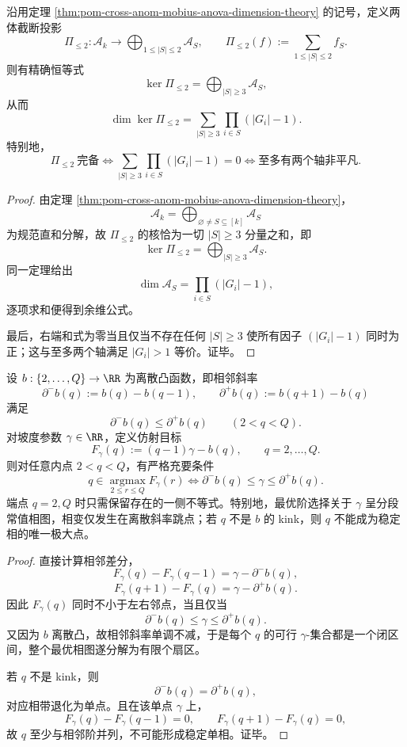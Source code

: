 \begin{theorem}[两体审计完备性的充要判据与精确余维]\label{thm:conclusion-two-body-audit-completeness-codimension}
沿用定理 \ref{thm:pom-cross-anom-mobius-anova-dimension-theory} 的记号，定义两体截断投影
\[
\Pi_{\le 2}:\mathcal A_k\to \bigoplus_{1\le |S|\le 2}\mathcal A_S,
\qquad
\Pi_{\le 2}(f):=\sum_{1\le |S|\le2} f_S.
\]
则有精确恒等式
\[
\ker \Pi_{\le2}=\bigoplus_{|S|\ge3}\mathcal A_S,
\]
从而
\[
\dim \ker \Pi_{\le2}
=
\sum_{|S|\ge3}\prod_{i\in S}(|G_i|-1).
\]
特别地，
\[
\Pi_{\le2}\ \text{完备}
\iff
\sum_{|S|\ge3}\prod_{i\in S}(|G_i|-1)=0
\iff
\text{至多有两个轴非平凡}.
\]
\end{theorem}
\begin{proof}
由定理 \ref{thm:pom-cross-anom-mobius-anova-dimension-theory}，
\[
\mathcal A_k=\bigoplus_{\varnothing\neq S\subseteq[k]}\mathcal A_S
\]
为规范直和分解，故 \(\Pi_{\le2}\) 的核恰为一切 \(|S|\ge3\) 分量之和，即
\[
\ker \Pi_{\le2}=\bigoplus_{|S|\ge3}\mathcal A_S.
\]
同一定理给出
\[
\dim \mathcal A_S=\prod_{i\in S}(|G_i|-1),
\]
逐项求和便得到余维公式。

最后，右端和式为零当且仅当不存在任何 \(|S|\ge3\) 使所有因子 \((|G_i|-1)\) 同时为正；这与至多两个轴满足 \(|G_i|>1\) 等价。证毕。
\end{proof}

\begin{theorem}\label{thm:conclusion-discrete-convex-budget-kink-fan}
设 \(b:\{2,\dots,Q\}\to\RR\) 为离散凸函数，即相邻斜率
\[
\partial^- b(q):=b(q)-b(q-1),
\qquad
\partial^+ b(q):=b(q+1)-b(q)
\]
满足
\[
\partial^- b(q)\le \partial^+ b(q)
\qquad (2<q<Q).
\]
对坡度参数 \(\gamma\in\RR\)，定义仿射目标
\[
F_\gamma(q):=(q-1)\gamma-b(q),
\qquad q=2,\dots,Q.
\]
则对任意内点 \(2<q<Q\)，有严格充要条件
\[
q\in \operatorname*{argmax}_{2\le r\le Q}F_\gamma(r)
\iff
\partial^- b(q)\le \gamma\le \partial^+ b(q).
\]
端点 \(q=2,Q\) 时只需保留存在的一侧不等式。特别地，最优阶选择关于 \(\gamma\) 呈分段常值相图，相变仅发生在离散斜率跳点；若 \(q\) 不是 \(b\) 的 kink，则 \(q\) 不能成为稳定相的唯一极大点。
\end{theorem}
\begin{proof}
直接计算相邻差分，
\[
F_\gamma(q)-F_\gamma(q-1)=\gamma-\partial^- b(q),
\]
\[
F_\gamma(q+1)-F_\gamma(q)=\gamma-\partial^+ b(q).
\]
因此 \(F_\gamma(q)\) 同时不小于左右邻点，当且仅当
\[
\partial^- b(q)\le \gamma\le \partial^+ b(q).
\]
又因为 \(b\) 离散凸，故相邻斜率单调不减，于是每个 \(q\) 的可行 \(\gamma\)-集合都是一个闭区间，整个最优相图遂分解为有限个扇区。

若 \(q\) 不是 kink，则
\[
\partial^- b(q)=\partial^+ b(q),
\]
对应相带退化为单点。且在该单点 \(\gamma\) 上，
\[
F_\gamma(q)-F_\gamma(q-1)=0,
\qquad
F_\gamma(q+1)-F_\gamma(q)=0,
\]
故 \(q\) 至少与相邻阶并列，不可能形成稳定单相。证毕。
\end{proof}

